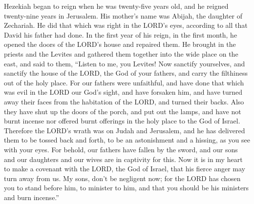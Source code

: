  Hezekiah began to reign when he was twenty-five years
old, and he reigned twenty-nine years in Jerusalem. His mother's name
was Abijah, the daughter of Zechariah.  He did that which
was right in the LORD's eyes, according to all that David his father had
done.  In the first year of his reign, in the first month,
he opened the doors of the LORD's house and repaired them.
 He brought in the priests and the Levites and gathered
them together into the wide place on the east,  and said
to them, ``Listen to me, you Levites! Now sanctify yourselves, and
sanctify the house of the LORD, the God of your fathers, and carry the
filthiness out of the holy place.  For our fathers were
unfaithful, and have done that which was evil in the LORD our God's
sight, and have forsaken him, and have turned away their faces from the
habitation of the LORD, and turned their backs.  Also they
have shut up the doors of the porch, and put out the lamps, and have not
burnt incense nor offered burnt offerings in the holy place to the God
of Israel.  Therefore the LORD's wrath was on Judah and
Jerusalem, and he has delivered them to be tossed back and forth, to be
an astonishment and a hissing, as you see with your eyes. 
For behold, our fathers have fallen by the sword, and our sons and our
daughters and our wives are in captivity for this.  Now
it is in my heart to make a covenant with the LORD, the God of Israel,
that his fierce anger may turn away from us.  My sons,
don't be negligent now; for the LORD has chosen you to stand before him,
to minister to him, and that you should be his ministers and burn
incense.''

